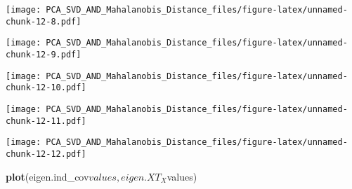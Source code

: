 \documentclass[]{article}
\newenvironment{Shaded}{\begin{snugshade}}{\end{snugshade}}
\newcommand{\KeywordTok}[1]{\textcolor[rgb]{0.13,0.29,0.53}{\textbf{{#1}}}}
\newcommand{\DecValTok}[1]{\textcolor[rgb]{0.00,0.00,0.81}{{#1}}}
\newcommand{\NormalTok}[1]{{#1}}
\begin{document}
\texttt{[image: PCA\_SVD\_AND\_Mahalanobis\_Distance\_files/figure-latex/unnamed-chunk-12-8.pdf]}

\begin{Shaded}
\end{Shaded}

\texttt{[image: PCA\_SVD\_AND\_Mahalanobis\_Distance\_files/figure-latex/unnamed-chunk-12-9.pdf]}

\begin{Shaded}
\end{Shaded}

\texttt{[image: PCA\_SVD\_AND\_Mahalanobis\_Distance\_files/figure-latex/unnamed-chunk-12-10.pdf]}

\begin{Shaded}
\end{Shaded}

\texttt{[image: PCA\_SVD\_AND\_Mahalanobis\_Distance\_files/figure-latex/unnamed-chunk-12-11.pdf]}

\begin{Shaded}
\end{Shaded}

\texttt{[image: PCA\_SVD\_AND\_Mahalanobis\_Distance\_files/figure-latex/unnamed-chunk-12-12.pdf]}

\begin{Shaded}
\begin{Highlighting}[]
\KeywordTok{plot}\NormalTok{(eigen.ind_cov$values,eigen.XT_X$values)}
\end{Highlighting}
\end{Shaded}
\end{document}
